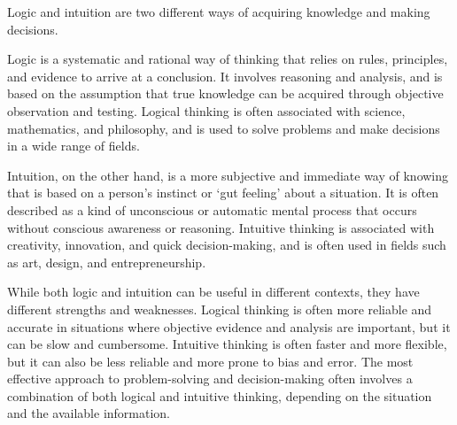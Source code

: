 Logic and intuition are two different ways of acquiring knowledge and making decisions. 

Logic is a systematic and rational way of thinking that relies on rules, principles, and evidence to arrive at a conclusion. It involves reasoning and analysis, and is based on the assumption that true knowledge can be acquired through objective observation and testing. Logical thinking is often associated with science, mathematics, and philosophy, and is used to solve problems and make decisions in a wide range of fields.

Intuition, on the other hand, is a more subjective and immediate way of knowing that is based on a person's instinct or `gut feeling' about a situation. It is often described as a kind of unconscious or automatic mental process that occurs without conscious awareness or reasoning. Intuitive thinking is associated with creativity, innovation, and quick decision-making, and is often used in fields such as art, design, and entrepreneurship.

While both logic and intuition can be useful in different contexts, they have different strengths and weaknesses. Logical thinking is often more reliable and accurate in situations where objective evidence and analysis are important, but it can be slow and cumbersome. Intuitive thinking is often faster and more flexible, but it can also be less reliable and more prone to bias and error. The most effective approach to problem-solving and decision-making often involves a combination of both logical and intuitive thinking, depending on the situation and the available information.